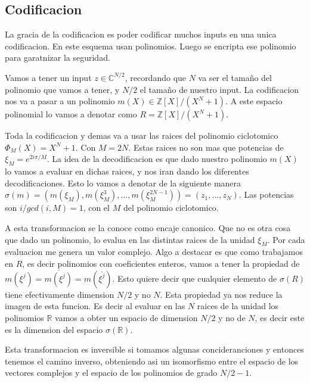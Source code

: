 \documentclass[12pt, oneside]{article}
\begin{document}


\subsection{Codificacion}

La gracia de la codificacion es poder codificar muchos inputs en una unica codificacion.
En este esquema usan polinomios.
Luego se encripta ese polinomio para garatnizar la seguridad.

Vamos a tener un input $z\in \mathbb{C}^{N/2}$, recordando que $N$ va ser el tamaño
del polinomio que vamos a tener, y $N/2$ el tamaño de nuestro input.
La codificacion nos va a pasar a un polinomio $m(X)\in \mathbb{Z}[X]/(X^N+1)$.
A este espacio polinomial lo vamos a denotar como $R= \mathbb{Z}[X]/(X^N+1)$.

Toda la codificacion y demas va a usar las raices del polinomio ciclotomico $\Phi_M(X)=
X^N+1$.
Con $M=2N$.
Estas raices no son mas que potencias de $\xi_M=e^{2i\pi/M}$.
La idea de la decodificacion es que dado nuestro polinomio $m(X)$ lo vamos a evaluar en dichas
raices, y nos iran dando los diferentes decodificaciones.
Esto lo vamos a denotar de la siguiente manera $\sigma(m) = (m(\xi_M), m(\xi_M^3),...,m(\xi_M^{2N-1}))=(z_1,...,z_N)$.
Las potencias son $i/gcd(i,M)=1$, con el $M$ del polinomio ciclotomico.


A esta transformacion se la conoce como encaje canonico.
Que no es otra cosa que dado un polinomio, lo evalua en las distintas raices de la unidad $\xi_M$.
Por cada evaluacion me genera un valor complejo.
Algo a destacar es que como trabajamos en  $R$, es decir polinomios con coeficientes enteros,
vamos a tener la propiedad de $m(\xi^j)=\overline{m(\xi^j)}=m(\overline{\xi^j})$.
Esto quiere decir que cualquier elemento de $\sigma(R)$ tiene efectivamente dimension
$N/2$ y no $N$.
Esta propiedad ya nos reduce la imagen de esta funcion.
Es decir al evaluar en las $N$ raices de la unidad los polinomios $\mathbb{R}$ vamos a
obter  un espacio de dimension $N/2$ y no de $N$, es decir este es la dimension del espacio
$\sigma(\mathbb{R})$.

Esta transformacion es inversible si tomamos algunas concideranciones y entonces tenemos el camino inverso, obteniendo asi un
isomorfismo entre el espacio de los vectores complejos y el espacio de los polinomios de grado
$N/2 -1$.
\end{document}
